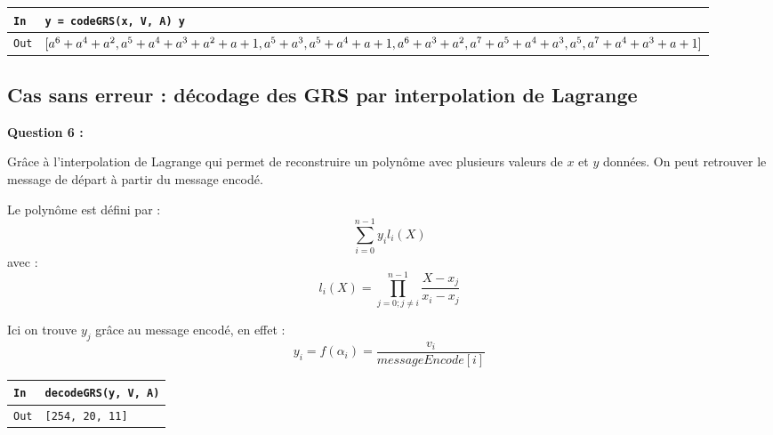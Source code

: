 \documentclass[titlepage]{article}
\begin{document}
            \begin{tabularx}{12cm}{|p{0.60cm}|X|}
            \hline
            \rowcolor{gray}
            \texttt{In}
            & 
            \texttt{y = codeGRS(x, V, A)\newline
            y}
            \\
            \hline
            \texttt{Out}
            &
            \texttt{$[a^6 + a^4 + a^2,\newline
            a^5 + a^4 + a^3 + a^2 + a + 1,\newline
            a^5 + a^3,\newline
            a^5 + a^4 + a + 1,\newline
            a^6 + a^3 + a^2,\newline
            a^7 + a^5 + a^4 + a^3,\newline
            a^5,\newline
            a^7 + a^4 + a^3 + a + 1]$}
            \\
            \hline
        \end{tabularx}
        \bigbreak

        \subsection{Cas sans erreur : décodage des GRS par interpolation de Lagrange}
        \textbf{Question 6 :}

        Grâce à l'interpolation de Lagrange qui permet de reconstruire un polynôme avec plusieurs valeurs de $x$ et $y$ données. 
        On peut retrouver le message de départ à partir du message encodé.

        Le polynôme est défini par :
        \[\sum_{i=0}^{n-1}y_il_i(X)\]
        avec :
        \[l_i(X) = \prod_{j = 0; j \neq i}^{n - 1}\frac{X-x_j}{x_i-x_j} \]

        Ici on trouve $y_j$ grâce au message encodé, en effet : 
        \[y_i = f(\alpha_i) = \frac{v_i}{messageEncode[i]}\]

        

        \begin{tabularx}{12cm}{|p{0.60cm}|X|}
            \hline
            \rowcolor{gray}
            \texttt{In}
            & 
            \texttt{decodeGRS(y, V, A)}
            \\
            \hline
            \texttt{Out}
            &
            \texttt{[254, 20, 11]}
            \\
            \hline
        \end{tabularx}
        \bigbreak
\end{document}
